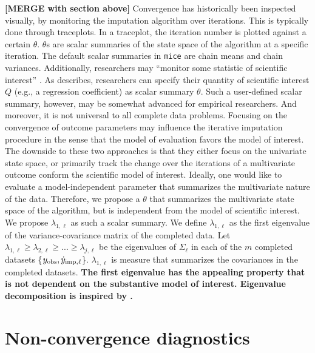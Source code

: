\documentclass[Royal,times,sageh]{sagej}
\begin{document}
\textbf{{[}MERGE with section above{]}} Convergence has historically been inspected visually, by monitoring the imputation algorithm over iterations. This is typically done through traceplots. In a traceplot, the iteration number is plotted against a certain \(\theta\). \(\theta\)s are scalar summaries of the state space of the algorithm at a specific iteration. The default scalar summaries in \texttt{mice} are chain means and chain variances. Additionally, researchers may ``monitor some statistic of scientific interest'' \citep[\(\S\) 6.5.2]{buur18}. As \citet{buur18} describes, researchers can specify their quantity of scientific interest \(Q\) (e.g., a regression coefficient) as scalar summary \(\theta\). Such a user-defined scalar summary, however, may be somewhat advanced for empirical researchers. And moreover, it is not universal to all complete data problems. Focusing on the convergence of outcome parameters may influence the iterative imputation procedure in the sense that the model of evaluation favors the model of interest. The downside to these two approaches is that they either focus on the univariate state space, or primarily track the change over the iterations of a multivariate outcome conform the scientific model of interest. Ideally, one would like to evaluate a model-independent parameter that summarizes the multivariate nature of the data. Therefore, we propose a \(\theta\) that summarizes the multivariate state space of the algorithm, but is independent from the model of scientific interest. We propose \(\lambda_{1, \ell}\) as such a scalar summary. We define \(\lambda_{1, \ell}\) as the first eigenvalue of the variance-covariance matrix of the completed data. Let \(\lambda_{1, \ell} \geq \lambda_{2, \ell} \geq ... \geq \lambda_{j, \ell}\) be the eigenvalues of \(\Sigma_\ell\) in each of the \(m\) completed datasets \{\(y_{\rm obs}, \dot y_{\rm imp, \ell}\)\}. \(\lambda_{1, \ell}\) is measure that summarizes the covariances in the completed datasets. \textbf{The first eigenvalue has the appealing property that is not dependent on the substantive model of interest. Eigenvalue decomposition is inspired by \citet{mack03}.}

\hypertarget{non-convergence-diagnostics}{%
\section{Non-convergence diagnostics}\label{non-convergence-diagnostics}}
\end{document}
